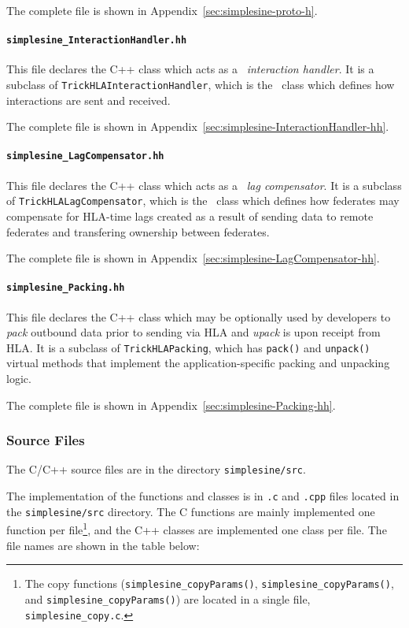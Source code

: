 The complete file is shown in Appendix~\ref{sec:simplesine-proto-h}.

\paragraph{\tt simplesine\_InteractionHandler.hh}
This file declares the \simplesine C++ class which acts as a
\TrickHLA\ {\em interaction handler}.
It is a subclass of {\tt TrickHLAInteractionHandler},
which is the \TrickHLA\ class which defines how interactions
are sent and received.

The complete file is shown in Appendix~\ref{sec:simplesine-InteractionHandler-hh}.

\paragraph{\tt simplesine\_LagCompensator.hh}
This file declares the \simplesine C++ class which acts as a
\TrickHLA\ {\em lag compensator}.
It is a subclass of {\tt TrickHLALagCompensator},
which is the \TrickHLA\ class which defines how federates may compensate
for HLA-time lags created as a result of sending data to remote federates
and transfering ownership between federates.

The complete file is shown in Appendix~\ref{sec:simplesine-LagCompensator-hh}.

\paragraph{\tt simplesine\_Packing.hh}
This file declares the \simplesine C++ class which may be optionally
used by developers to {\em pack} outbound data prior to sending via HLA
and {\em upack} is upon receipt from HLA.
It is a subclass of {\tt TrickHLAPacking},
which has {\tt pack()} and {\tt unpack()} virtual methods that implement
the application-specific packing and unpacking logic.

The complete file is shown in Appendix~\ref{sec:simplesine-Packing-hh}.


\subsubsection{Source Files}

The \simplesine C/C++ source files are in the directory {\tt simplesine/src}.

The implementation of the \simplesine functions and classes is in
{\tt .c} and {\tt .cpp} files located in the {\tt simplesine/src} directory.
The C functions are mainly implemented one function per file\footnote{
  The copy functions
  ({\tt simplesine\_copyParams()},
  {\tt simplesine\_copyParams()}, and
  {\tt simplesine\_copyParams()})
  are located in a single file, {\tt simplesine\_copy.c}.
},
and the C++ classes are implemented one class per file.
The file names are shown in the table below:


